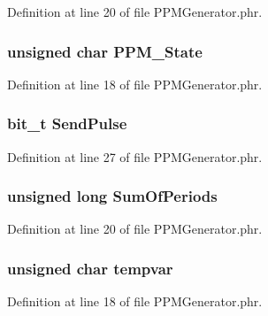Definition at line 20 of file P\-P\-M\-Generator.\-phr.

\subsubsection[{P\-P\-M\-\_\-\-State}]{\setlength{\rightskip}{0pt plus 5cm}unsigned char P\-P\-M\-\_\-\-State}\label{_p_p_m_generator_8phr_a18d8bc8a9be8e37de6acd9dd92fed209}


Definition at line 18 of file P\-P\-M\-Generator.\-phr.

\subsubsection[{Send\-Pulse}]{\setlength{\rightskip}{0pt plus 5cm}bit\-\_\-t Send\-Pulse}\label{_p_p_m_generator_8phr_aafe5d17d764f167e414ce013f279b889}


Definition at line 27 of file P\-P\-M\-Generator.\-phr.

\subsubsection[{Sum\-Of\-Periods}]{\setlength{\rightskip}{0pt plus 5cm}unsigned long Sum\-Of\-Periods}\label{_p_p_m_generator_8phr_a2945ba2113bb2daae5840aa783f20df3}


Definition at line 20 of file P\-P\-M\-Generator.\-phr.

\subsubsection[{tempvar}]{\setlength{\rightskip}{0pt plus 5cm}unsigned char tempvar}\label{_p_p_m_generator_8phr_a6bb5ad6a4f802a6f8f847d997b10f071}


Definition at line 18 of file P\-P\-M\-Generator.\-phr.

